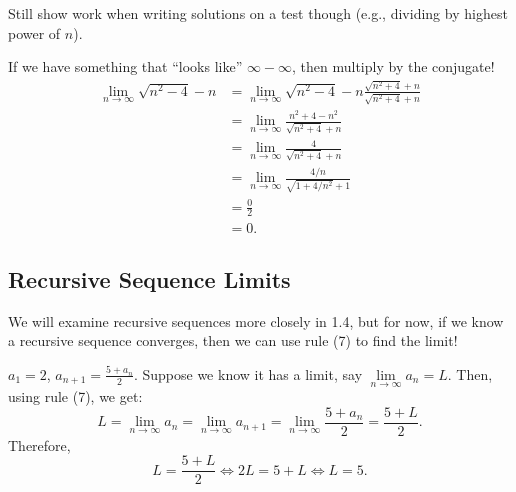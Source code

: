 \begin{Remark}{}{}
    Still show work when writing solutions on a test though (e.g.,
    dividing by highest power of $ n $).
\end{Remark}
\begin{Example}{}{}
    If we have something that ``looks like'' $ \infty-\infty $,
    then multiply by the conjugate!
    \begin{align*}
        \lim\limits_{{n} \to {\infty}}\sqrt{n^2-4}-n
         & =\lim\limits_{{n} \to {\infty}}\sqrt{n^2-4}-n \frac{\sqrt{n^2+4}+n}{\sqrt{n^2+4}+n} \\
         & =\lim\limits_{{n} \to {\infty}}\frac{n^2+4-n^2}{\sqrt{n^2+4}+n}                     \\
         & =\lim\limits_{{n} \to {\infty}}\frac{4}{\sqrt{n^2+4}+n}                             \\
         & =\lim\limits_{{n} \to {\infty}}\frac{4/n}{\sqrt{1+4/n^2}+1}                         \\
         & =\frac{0}{2}                                                                        \\
         & =0.
    \end{align*}
\end{Example}
\subsection*{Recursive Sequence Limits}
We will examine recursive sequences more closely in 1.4,
but for now, if we know a recursive sequence converges,
then we can use rule (7) to find the limit!
\begin{Example}{}{}
    $ a_1=2 $, $ a_{n+1}=\frac{5+a_n}{2} $.
    Suppose we know it has a limit, say $ \lim\limits_{{n} \to {\infty}}a_n=L $.
    Then, using rule (7), we get:
    \[ L=\lim\limits_{{n} \to {\infty}}a_n=
        \lim\limits_{{n} \to {\infty}}a_{n+1}=
        \lim\limits_{{n} \to {\infty}}\frac{5+a_n}{2}=
        \frac{5+L}{2}. \]
    Therefore,
    \[ L=\frac{5+L}{2}\iff 2L=5+L\iff L=5. \]
\end{Example}
